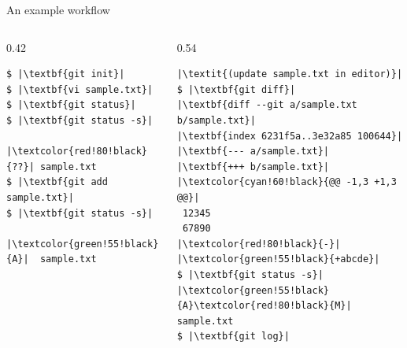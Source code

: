 \documentclass[aspectratio=169,11pt,t]{beamer}
\begin{document}
\begin{frame}[fragile]{An example workflow}
  \lstset{basicstyle=\ttfamily\footnotesize,escapechar=|,aboveskip=2pt}
  \begin{columns}[T]
    \begin{column}{0.42\textwidth}
\begin{lstlisting}
$ |\textbf{git init}|
$ |\textbf{vi sample.txt}|
$ |\textbf{git status}|
$ |\textbf{git status -s}|
    |\textcolor{red!80!black}{??}| sample.txt
$ |\textbf{git add sample.txt}|
$ |\textbf{git status -s}|
    |\textcolor{green!55!black}{A}|  sample.txt
\end{lstlisting}
    \end{column}
    \begin{column}{0.54\textwidth}
\begin{lstlisting}
|\textit{(update sample.txt in editor)}|
$ |\textbf{git diff}|
|\textbf{diff --git a/sample.txt b/sample.txt}|
|\textbf{index 6231f5a..3e32a85 100644}|
|\textbf{--- a/sample.txt}|
|\textbf{+++ b/sample.txt}|
|\textcolor{cyan!60!black}{@@ -1,3 +1,3 @@}|
 12345
 67890
|\textcolor{red!80!black}{-}|
|\textcolor{green!55!black}{+abcde}|
$ |\textbf{git status -s}|
|\textcolor{green!55!black}{A}\textcolor{red!80!black}{M}| sample.txt
$ |\textbf{git log}|
\end{lstlisting}
    \end{column}
  \end{columns}
\end{frame}
\end{document}
